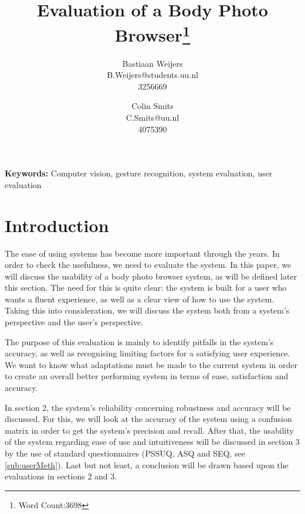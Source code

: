 \documentclass[11pt,a4paper]{article}
\author{Bastiaan Weijers \\ B.Weijers@students.uu.nl \\ 3256669 \and Colin Smits \\ C.Smits@uu.nl \\ 4075390}
\title{Evaluation of a Body Photo Browser\footnote{Word Count:3698}}
\begin{document}
\maketitle
{}

\vspace{1cm}

\noindent \textbf{Keywords:} Computer vision, gesture recognition, system evaluation, user evaluation
 
\noindent\makebox[\linewidth]{\rule{\textwidth}{0.4pt}}

\section{Introduction}
The ease of using systems has become more important through the years. In order to check the usefulness, we need to evaluate the system. In this paper, we will discuss the usability of a body photo browser system, as will be defined later this section. The need for this is quite clear: the system is built for a user who wants a fluent experience, as well as a clear view of how to use the system. Taking this into consideration, we will discuss the system both from a system's perspective and the user's perspective.

The purpose of this evaluation is mainly to identify pitfalls in the system's accuracy, as well as recognising limiting factors for a satisfying user experience. We want to know what adaptations must be made to the current system in order to create an overall better performing system in terms of ease, satisfaction and accuracy.



In section 2, the system's reliability concerning robustness and accuracy will be discussed. For this, we will look at the accuracy of the system using a confusion matrix in order to get the system's precision and recall. After that, the usability of the system regarding ease of use and intuitiveness will be discussed in section 3 by the use of standard questionnaires (PSSUQ, ASQ and SEQ, see \ref{sub:userMeth}). Last but not least, a conclusion will be drawn based upon the evaluations in sections 2 and 3.
\end{document}
